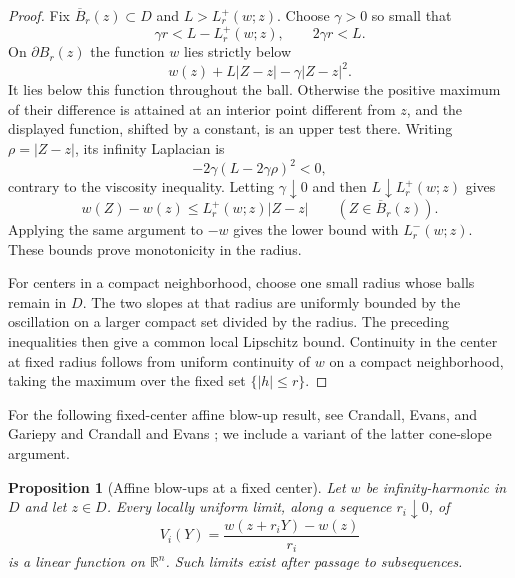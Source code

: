 \documentclass[11pt]{article}
\numberwithin{equation}{section}
\newtheorem{proposition}[theorem]{Proposition}
\theoremstyle{definition}
\theoremstyle{remark}
\newcommand{\R}{\mathbb{R}}
\begin{document}
\begin{proof}
Fix $\overline B_r(z)\subset D$ and $L>L_r^+(w;z)$. Choose $\gamma>0$ so small that
\[
  \gamma r<L-L_r^+(w;z),\qquad 2\gamma r<L.
\]
On $\partial B_r(z)$ the function $w$ lies strictly below
\[
  w(z)+L|Z-z|-\gamma|Z-z|^2.
\]
It lies below this function throughout the ball. Otherwise the positive maximum of their difference is attained at an interior point different from $z$, and the displayed function, shifted by a constant, is an upper test there. Writing $\rho=|Z-z|$, its infinity Laplacian is
\[
  -2\gamma(L-2\gamma\rho)^2<0,
\]
contrary to the viscosity inequality. Letting $\gamma\downarrow0$ and then $L\downarrow L_r^+(w;z)$ gives
\[
  w(Z)-w(z)\le L_r^+(w;z)|Z-z|\qquad (Z\in\overline B_r(z)).
\]
Applying the same argument to $-w$ gives the lower bound with $L_r^-(w;z)$. These bounds prove monotonicity in the radius.

For centers in a compact neighborhood, choose one small radius whose balls remain in $D$. The two slopes at that radius are uniformly bounded by the oscillation on a larger compact set divided by the radius. The preceding inequalities then give a common local Lipschitz bound. Continuity in the center at fixed radius follows from uniform continuity of $w$ on a compact neighborhood, taking the maximum over the fixed set $\{|h|\le r\}$.
\end{proof}

For the following fixed-center affine blow-up result, see Crandall, Evans, and Gariepy \cite{CrandallEvansGariepy2001} and Crandall and Evans \cite[pp.~124--127]{CrandallEvans2001}; we include a variant of the latter cone-slope argument.

\begin{proposition}[Affine blow-ups at a fixed center]\label{prop:affine-blowups}
Let $w$ be infinity-harmonic in $D$ and let $z\in D$. Every locally uniform limit, along a sequence $r_i\downarrow0$, of
\[
  V_i(Y)=\frac{w(z+r_iY)-w(z)}{r_i}
\]
is a linear function on $\R^n$. Such limits exist after passage to subsequences.
\end{proposition}
\end{document}
